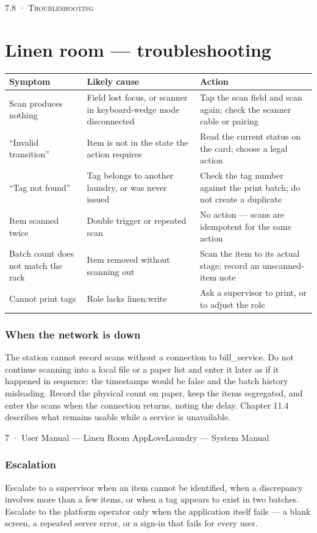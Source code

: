 \documentclass[11pt,a4paper,oneside]{book}
\begin{document}
\textsc{\small\color{crimson}7.8 · Troubleshooting}\par\medskip
\section*{Linen room — troubleshooting}
\begin{center}\small
\begin{tabularx}{\linewidth}{|X|X|X|}
\hline
\rowcolor{lightgrey}
\textbf{Symptom} & \textbf{Likely cause} & \textbf{Action} \\ \hline
Scan produces nothing & Field lost focus, or scanner in keyboard-wedge mode disconnected & Tap the scan field and scan again; check the scanner cable or pairing \\ \hline
“Invalid transition” & Item is not in the state the action requires & Read the current status on the card; choose a legal action \\ \hline
“Tag not found” & Tag belongs to another laundry, or was never issued & Check the tag number against the print batch; do not create a duplicate \\ \hline
Item scanned twice & Double trigger or repeated scan & No action — scans are idempotent for the same action \\ \hline
Batch count does not match the rack & Item removed without scanning out & Scan the item to its actual stage; record an unscanned-item note \\ \hline
Cannot print tags & Role lacks linen:write & Ask a supervisor to print, or to adjust the role \\ \hline
\end{tabularx}
\end{center}
\subsubsection*{When the network is down}
The station cannot record scans without a connection to bill\_service. Do not continue scanning into a local file or a paper list and enter it later as if it happened in sequence: the timestamps would be false and the batch history misleading. Record the physical count on paper, keep the items segregated, and enter the scans when the connection returns, noting the delay. Chapter 11.4 describes what remains usable while a service is unavailable.

7 · User Manual — Linen Room AppLoveLaundry — System Manual

\subsubsection*{Escalation}
Escalate to a supervisor when an item cannot be identified, when a discrepancy involves more than a few items, or when a tag appears to exist in two batches. Escalate to the platform operator only when the application itself fails — a blank screen, a repeated server error, or a sign-in that fails for every user.
\end{document}
